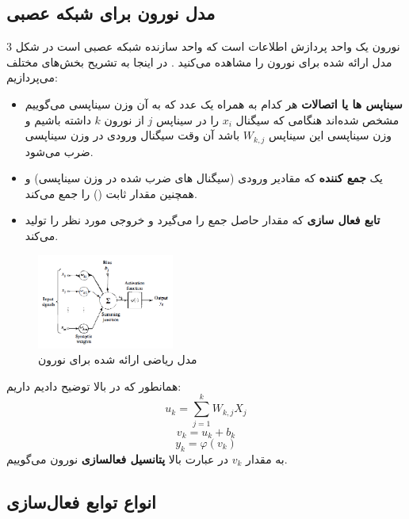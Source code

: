 \documentclass[11pt,a4paper,twocolumn]{article}
\begin{document}
\subsection{مدل نورون برای شبکه عصبی}
نورون یک واحد پردازش اطلاعات است که واحد سازنده شبکه عصبی است در شکل 3 مدل ارائه شده برای نورون را مشاهده می‌کنید . در اینجا به تشریح بخش‌های مختلف می‌پردازیم:
\begin{itemize}
\item
\textbf{سیناپس ها یا اتصالات}
هر کدام به همراه یک عدد که به آن وزن سیناپسی می‌گوییم مشخص شده‌اند هنگامی که سیگنال
$x_i$
را در سیناپس
$j$
از نورون
$k$
داشته باشیم و وزن سیناپسی این سیناپس
$W_{k,j}$
باشد آن وقت سیگنال ورودی در وزن سیناپسی ضرب می‌شود.
\item
یک \textbf{جمع کننده}  که مقادیر ورودی (سیگنال های ضرب شده در وزن سیناپسی) و همچنین مقدار ثابت () را جمع می‌کند.
\item
\textbf{تابع فعال سازی}
که مقدار حاصل جمع را می‌گیرد و خروجی مورد نظر را تولید می‌کند.	
\end{itemize}

\begin{figure}
  \centering
    \includegraphics[width=0.4\textwidth]{neuron.png}
  \caption{مدل ریاضی ارائه شده برای نورون \cite{haykin}}
  \label{fig:neuron}
\end{figure}

همانطور که در بالا توضیح دادیم داریم:
$$u_k = \sum_{j=1}^{k}{W_{k,j}X_j}$$
$$v_k = u_k + b_k$$
$$y_k = \varphi(v_k)$$
به مقدار $v_k$ در عبارت بالا
\textbf{پتانسیل فعالسازی}
نورون می‌گوییم.

\subsection{انواع توابع فعال‌سازی}
\label{sec:activation}
\end{document}
